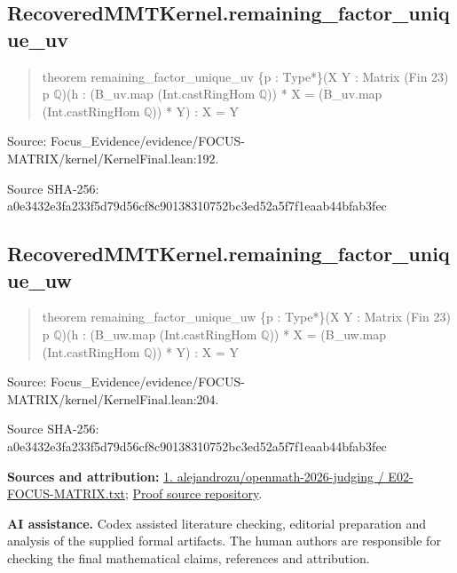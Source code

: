 \documentclass[11pt,a4paper]{article}
\begin{document}
\begin{samepage}
\subsection{RecoveredMMTKernel.remaining\_factor\_unique\_uv}
\begin{quote}\small\ttfamily theorem remaining\_factor\_unique\_uv \{p : Type*\}\newline     (X Y : Matrix (Fin 23) p \ensuremath{\mathbb{Q}})\newline     (h : (B\_uv.map (Int.castRingHom \ensuremath{\mathbb{Q}})) * X = (B\_uv.map (Int.castRingHom \ensuremath{\mathbb{Q}})) * Y) : X = Y\end{quote}
{\small Source: Focus\_Evidence/evidence/FOCUS-MATRIX/kernel/KernelFinal.lean:192.\par}

{\small Source SHA-256: a0e3432e3fa233f5d79d56cf8c90138310752bc3ed52a5f7f1eaab44bfab3fec\par}

\end{samepage}
\begin{samepage}
\subsection{RecoveredMMTKernel.remaining\_factor\_unique\_uw}
\begin{quote}\small\ttfamily theorem remaining\_factor\_unique\_uw \{p : Type*\}\newline     (X Y : Matrix (Fin 23) p \ensuremath{\mathbb{Q}})\newline     (h : (B\_uw.map (Int.castRingHom \ensuremath{\mathbb{Q}})) * X = (B\_uw.map (Int.castRingHom \ensuremath{\mathbb{Q}})) * Y) : X = Y\end{quote}
{\small Source: Focus\_Evidence/evidence/FOCUS-MATRIX/kernel/KernelFinal.lean:204.\par}

{\small Source SHA-256: a0e3432e3fa233f5d79d56cf8c90138310752bc3ed52a5f7f1eaab44bfab3fec\par}

{\small\textbf{Sources and attribution:} \href{https://github.com/alejandrozu/openmath-2026-judging/blob/d0ed487f487fa7ec814ff705ab55249983fe8707/OpenMath-Judging/review/entries/E02-FOCUS-MATRIX.txt}{1. alejandrozu/openmath-2026-judging / E02-FOCUS-MATRIX.txt}; \href{https://github.com/alejandrozu/openmath-2026-judging}{Proof source repository}.\par}

\end{samepage}
{\small \textbf{AI assistance.} Codex assisted literature checking, editorial preparation and analysis of the supplied formal artifacts. The human authors are responsible for checking the final mathematical claims, references and attribution.\par}
\end{document}
